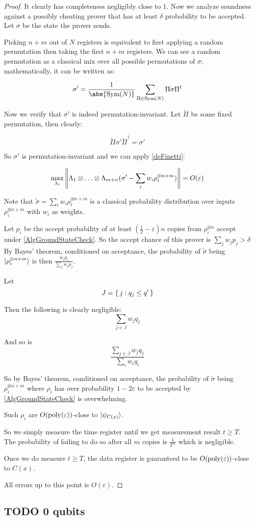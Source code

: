 \begin{proof}
	It clearly has completeness negligibly close to $1$. Now we analyze soundness against a possibly cheating prover that has at least $\delta$ probability to be accepted. Let $\sigma$ be the state the prover sends.

	Picking $n+m$ out of $N$ registers is equivalent to first applying a random permutation then taking the first $n+m$ registers.
	We can see a random permutation as a classical mix over all possible permutations of $\sigma$; mathematically, it can be written as:

	$$\sigma'=\frac{1}{\abs{\Sym(N)}}\sum_{\Pi\in\Sym(N)}\Pi\sigma\Pi^\dagger$$

	Now we verify that $\sigma'$ is indeed permutation-invariant.
	Let $\tilde{\Pi}$ be some fixed permutation, then clearly:

	$$\tilde{\Pi}\sigma'\tilde{\Pi}^\dagger=\sigma'$$

	So $\sigma'$ is permutation-invariant and we can apply \autoref{deFinetti}:

	$$\max_{\Lambda_i}\left\lVert\Lambda_1\otimes\ldots\otimes\Lambda_{m+n}(\sigma'-\sum_i w_i\rho_i^{\otimes n+m})\right\rVert=O(\varepsilon)$$

	Note that $\tilde\sigma=\sum_i w_i\rho_i^{\otimes n+m}$ is a classical probability distribution over inputs $\rho_i^{\otimes n+m}$ with $w_i$ as weights.

	Let $p_i$ be the accept probability of at least $(\frac{1}{2}-\varepsilon)n$ copies from $\rho_i^{\otimes n}$ accept under \autoref{AlgGroundStateCheck}.
	So the accept chance of this prover is $\sum_j w_j p_j>\delta$
	By Bayes' theorem, conditioned on acceptance, the probability of $\tilde{\sigma}$ being $\ket{\rho_i^{\otimes n+m}}$ is then $\frac{w_i p_i}{\sum_j w_j p_j}$.

	Let
	$$J=\set{j:q_j\leq q'}$$

	Then the following is clearly negligible:
	$$\sum_{j\in J} w_j q_j$$

	And so is
	$$\frac{\sum_{j\in J} w_j q_j}{\sum_i w_i q_i}$$

	So by Bayes' theorem, conditioned on acceptance, the probability of $\tilde{\sigma}$ being $\rho_i^{\otimes n+m}$ where $\rho_i$ has over probability $1-2\varepsilon$ to be accepted by \autoref{AlgGroundStateCheck} is overwhelming.

	Such $\rho_i$ are $O(\operatorname*{\operatorname{poly}}(\varepsilon))$-close to $\ket{\psi_{C(x)}}$.

	So we simply measure the time register until we get measurement result $t\geq T$. The probability of failing to do so after all $m$ copies is $\frac{1}{2^m}$ which is negligible.
	
	Once we do measure $t\geq T$, the data register is guaranteed to be $O(\operatorname*{\operatorname{poly}}(\varepsilon))$-close to $C(x)$.

	All errors up to this point is $O(\varepsilon)$.
\end{proof}

\subsection{TODO 0 qubits}



